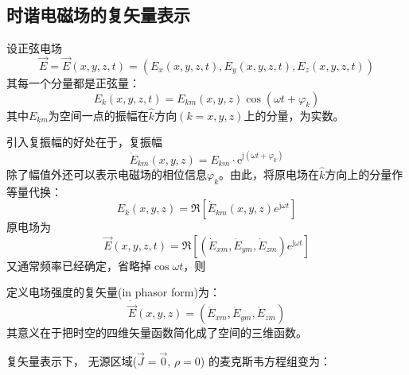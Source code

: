     \subsection{时谐电磁场的复矢量表示}
        {\color{gray}设正弦电场
        \begin{equation}
            \vec{E}=\vec{E}\left(x,y,z,t\right)=\left(E_x\left(x,y,z,t\right),E_y\left(x,y,z,t\right),E_z\left(x,y,z,t\right)\right)
        \end{equation}
        其每一个分量都是正弦量：
        \begin{equation}
            E_k\left(x,y,z,t\right)=E_{km}\left(x,y,z\right)\cos{\left(\omega t+\varphi_k\right)}
        \end{equation}
        其中$E_{km}$为空间一点的振幅在$\hat{k}$方向$(k=x,y,z)$上的分量，为实数。
        
        
        引入复振幅的好处在于，复振幅
        \begin{equation*}
            \dot{E}_{km}\left(x,y,z\right)=E_{km}\cdot \mathrm{e}^{\mathrm{j}(\omega t+\varphi_k)}
        \end{equation*}
        除了幅值外还可以表示电磁场的相位信息$\varphi_k$。由此，将原电场在$\hat{k}$方向上的分量作等量代换：
        \begin{equation}
            E_k\left(x,y,z\right)=\Re\left[{\dot{E}}_{km}\left(x,y,z\right)e^{\mathrm{j}\omega t}\right]
        \end{equation}
        原电场为
        \begin{equation}
            \vec{E}\left(x,y,z,t\right)=\Re\left[\left({\dot{E}}_{xm},{\dot{E}}_{ym},{\dot{E}}_{zm}\right)e^{\mathrm{j}\omega t}\right]
        \end{equation}
        又通常频率已经确定，省略掉$\cos{\omega t}$，则}定义电场强度的复矢量(in phasor form)为：
        \begin{equation}
            \dot{\vec{E}}(x,y,z)=\left({\dot{E}}_{xm},{\dot{E}}_{ym},{\dot{E}}_{zm}\right)
        \end{equation}
            其意义在于把时空的四维矢量函数简化成了空间的三维函数。


        复矢量表示下， 无源区域($\vec{J}=\vec{0},\,\rho=0$)  的麦克斯韦方程组变为：
        
